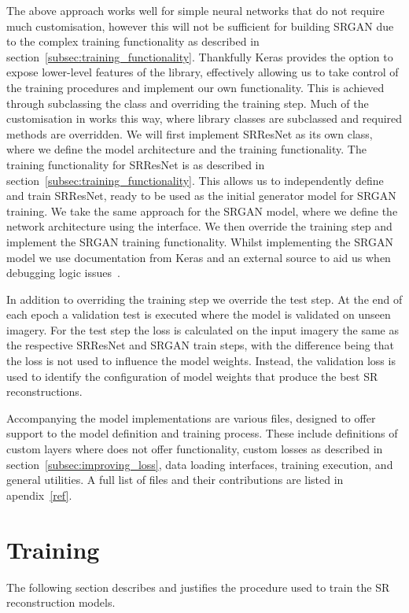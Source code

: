 The above approach works well for simple neural networks that do not require much customisation, however this will not be sufficient for building SRGAN due to the complex training functionality as described in section~\ref{subsec:training_functionality}. Thankfully Keras provides the option to expose lower-level features of the library, effectively allowing us to take control of the training procedures and implement our own functionality. This is achieved through subclassing the  class and overriding the training step. Much of the customisation in  works this way, where library classes are subclassed and required methods are overridden. We will first implement SRResNet as its own class, where we define the model architecture and the training functionality. The training functionality for SRResNet is as described in section~\ref{subsec:training_functionality}. This allows us to independently define and train SRResNet, ready to be used as the initial generator model for SRGAN training. We take the same approach for the SRGAN model, where we define the network architecture using the  interface. We then override the training step and implement the SRGAN training functionality. Whilst implementing the SRGAN model we use documentation from Keras and an external source to aid us when debugging logic issues~\cite{ref, srganImplementation}.

In addition to overriding the training step we override the test step. At the end of each epoch a validation test is executed where the model is validated on unseen imagery. For the test step the loss is calculated on the input imagery the same as the respective SRResNet and SRGAN train steps, with the difference being that the loss is not used to influence the model weights. Instead, the validation loss is used to identify the configuration of model weights that produce the best SR reconstructions.

Accompanying the model implementations are various  files, designed to offer support to the model definition and training process. These include definitions of custom layers where  does not offer functionality, custom losses as described in section~\ref{subsec:improving_loss}, data loading interfaces, training execution, and general utilities. A full list of  files and their contributions are listed in apendix~\ref{ref}.

\section{Training}
The following section describes and justifies the procedure used to train the SR reconstruction models.

